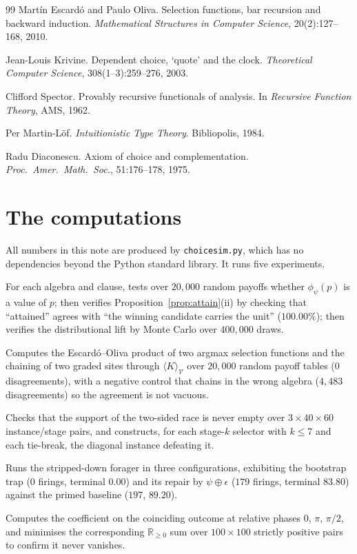 \documentclass[11pt]{article}
\theoremstyle{definition}
\theoremstyle{plain}
\theoremstyle{remark}
\newcommand{\V}{\mathcal{V}}
\newcommand{\sumv}{\oplus}
\newcommand{\Rnn}{\mathbb{R}_{\geq 0}}
\newcommand{\LLPO}{\mathrm{LLPO}}
\begin{document}
\begin{thebibliography}{99}
 Mart\'in Escard\'o and Paulo Oliva. Selection functions, bar
recursion and backward induction. \emph{Mathematical Structures in Computer Science},
20(2):127--168, 2010.

 Jean-Louis Krivine. Dependent choice, `quote' and the clock.
\emph{Theoretical Computer Science}, 308(1--3):259--276, 2003.

 Clifford Spector. Provably recursive functionals of analysis.
In \emph{Recursive Function Theory}, AMS, 1962.

 Per Martin-L\"of. \emph{Intuitionistic Type Theory}. Bibliopolis,
1984.

 Radu Diaconescu. Axiom of choice and complementation.
\emph{Proc.\ Amer.\ Math.\ Soc.}, 51:176--178, 1975.

\end{thebibliography}

\appendix
\section{The computations}\label{app:comp}

All numbers in this note are produced by \texttt{choicesim.py}, which has no
dependencies beyond the Python standard library. It runs five experiments.

\begin{description}[leftmargin=2.2em,itemsep=3pt]
\item[E1, attainability.] For each algebra and clause, tests over $20{,}000$ random
payoffs whether $\phi_\psi(p)$ is a value of $p$; then verifies
Proposition~\ref{prop:attain}(ii) by checking that ``attained'' agrees with ``the
winning candidate carries the unit'' ($100.00\%$); then verifies the distributional
lift by Monte Carlo over $400{,}000$ draws.
\item[E2, the product.] Computes the Escard\'o--Oliva product of two argmax selection
functions and the chaining of two graded sites through $\langle K \rangle_\V$ over
$20{,}000$ random payoff tables ($0$ disagreements), with a negative control that
chains in the wrong algebra ($4{,}483$ disagreements) so the agreement is not vacuous.
\item[E3, $\LLPO$.] Checks that the support of the two-sided race is never empty over
$3 \times 40 \times 60$ instance/stage pairs, and constructs, for each stage-$k$
selector with $k \leq 7$ and each tie-break, the diagonal instance defeating it.
\item[E4, fairness.] Runs the stripped-down forager in three configurations, exhibiting
the bootstrap trap ($0$ firings, terminal $0.00$) and its repair by $\psi \sumv
\epsilon$ ($179$ firings, terminal $83.80$) against the primed baseline ($197$,
$89.20$).
\item[E5, the deficit.] Computes the coefficient on the coinciding outcome at relative
phases $0$, $\pi$, $\pi/2$, and minimises the corresponding $\Rnn$ sum over
$100 \times 100$ strictly positive pairs to confirm it never vanishes.
\end{description}
\end{document}
